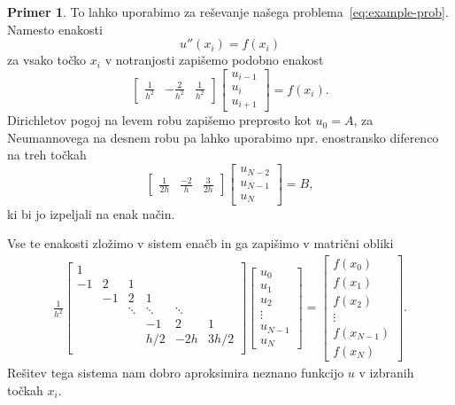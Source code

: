 \documentclass[12pt,a4paper,twoside]{article}
\theoremstyle{definition} %
\newtheorem{primer}[definicija]{Primer}
\theoremstyle{plain} %
\numberwithin{equation}{section}
\begin{document}
\begin{primer}
To lahko uporabimo za reševanje našega problema~\eqref{eq:example-prob}.
Namesto enakosti
\[ u''(x_i) = f(x_i) \]
za vsako točko $x_i$ v notranjosti zapišemo podobno enakost
\[
  \begin{bmatrix}
    \frac{1}{h^2} & -\frac{2}{h^2} & \frac{1}{h^2}
  \end{bmatrix}\begin{bmatrix}
    u_{i-1} \\ u_{i} \\ u_{i+1}
  \end{bmatrix} = f(x_i).
\]
Dirichletov pogoj na levem robu zapišemo preprosto kot $u_0 = A$,
za Neumannovega na desnem robu pa lahko uporabimo npr. enostransko diferenco
na treh točkah \[
  \begin{bmatrix}
    \frac{1}{2h} & \frac{-2}{h} & \frac{3}{2h}
  \end{bmatrix}\begin{bmatrix}
    u_{N-2} \\ u_{N-1} \\ u_{N}
  \end{bmatrix} = B,
\]
ki bi jo izpeljali na enak način.

Vse te enakosti zložimo v sistem enačb in ga zapišimo v matrični obliki
\begin{align*}
  \frac{1}{h^2}
  \begin{bmatrix}
    1 &  \\
    -1 & 2 & 1 \\
    & -1 & 2 & 1 \\
    & & \!\ddots & \!\ddots & \! \ddots \\
    &&& -1 & 2 & 1 \\
    &&& h/2 & -2h & 3h/2 \\
  \end{bmatrix}
\begin{bmatrix}
  u_0 \\ u_1 \\ u_2 \\ \vdots \\ u_{N-1} \\ u_N
\end{bmatrix}
 =
 \begin{bmatrix}
   f(x_0) \\
   f(x_1) \\
   f(x_2) \\
   \vdots \\
   f(x_{N-1}) \\
   f(x_N)
 \end{bmatrix}.
\end{align*}
Rešitev tega sistema nam dobro aproksimira neznano funkcijo $u$ v izbranih
točkah $x_i$.
\end{primer}
\end{document}
